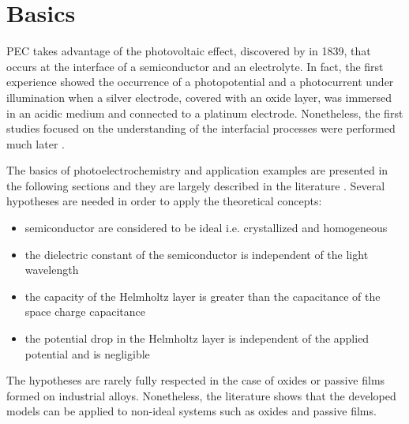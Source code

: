 \section{Basics}\label{sec_basics}
    PEC takes advantage of the photovoltaic effect, discovered by 
    \citet{becquerel1839} in 1839, that occurs at the interface of a semiconductor
    and an electrolyte. 
    In fact, the first experience showed the occurrence of a photopotential and 
    a photocurrent under illumination when a silver electrode, 
    covered with an oxide layer, was immersed in an acidic medium and connected 
    to a platinum electrode. 
    Nonetheless, the first studies focused on the understanding of the interfacial 
    processes were performed much later 
    \citep{stimming1986,gerischer1966,copeland1942}.

    The basics of photoelectrochemistry and application examples are presented in 
    the following sections and they are largely described in the literature 
    \citep{morrison1980,gerischer1985,memming2008,marcus2006,bard2002,sato1998}. 
    Several hypotheses are needed in order to apply the theoretical concepts:  
    \begin{itemize}
        \item semiconductor are considered to be ideal i.e. crystallized and homogeneous  
        \item the dielectric constant of the semiconductor is independent of the light wavelength  
        \item the capacity of the Helmholtz layer is greater than the capacitance of the space charge capacitance  
        \item the potential drop in the Helmholtz layer is independent of the applied potential and is negligible
    \end{itemize}

    The hypotheses are rarely fully respected in the case of oxides or passive 
    films formed on industrial alloys. Nonetheless, the literature shows that the 
    developed models can be applied to non-ideal systems such as oxides 
    and passive films.


